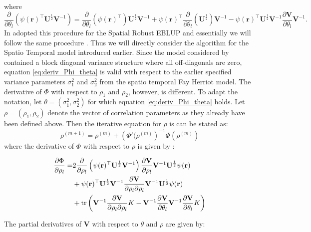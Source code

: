 where \[
\frac{\partial}{\partial\theta_l}\left(\psi(\mathbf{r})^\top\mathbf{U}^{\frac{1}{2}}\mathbf{V}^{-1}\right) = \frac{\partial}{\partial\theta_l}(\psi(\mathbf{r})^\top)\mathbf{U}^\frac{1}{2}\mathbf{V}^{-1} + \psi(\mathbf{r})^\top\frac{\partial}{\partial\theta_l}(\mathbf{U}^\frac{1}{2})\mathbf{V}^{-1} - \psi(\mathbf{r})^\top\mathbf{U}^\frac{1}{2}\mathbf{V}^{-1}\frac{\partial\mathbf{V}}{\partial\theta_l}\mathbf{V}^{-1}.
\] In \textcite{Sch12} adopted this procedure for the Spatial Robust
EBLUP and essentially we will follow the same procedure
\textcite[p.74ff.]{Sch12}. Thus we will directly consider the algorithm
for the Spatio Temporal model introduced earlier. Since the model
considered by \textcite{Sin09} contained a block diagonal variance
structure where all off-diagonals are zero, equation
\ref{eq:deriv_Phi_theta} is valid with respect to the earlier specified
variance parameters $\sigma_1^2$ and $\sigma_2^2$ from the spatio
temporal Fay Herriot model. The derivative of $\Phi$ with respect to
$\rho_1$ and $\rho_2$, however, is different. To adapt the notation, let
$\theta = (\sigma_1^2, \sigma_2^2)$ for which equation
\ref{eq:deriv_Phi_theta} holds. Let $\rho = (\rho_1, \rho_2)$ denote the
vector of correlation parameters as they already have been defined
above. Then the iterative equation for $\rho$ is can be stated as: \[
\rho^{(m+1)} = \rho^{(m)} + \left(\Phi'(\rho^{(m)}\right)^{-1}\Phi(\rho^{(m)})
\] where the derivative of $\Phi$ with respect to $\rho$ is given by
\textcite[p.76]{Sch12}:

\begin{align*}
\frac{\partial\Phi}{\partial\rho_l} =& 2\frac{\partial}{\partial\rho_l}\left(\psi(\mathbf{r})^\top\mathbf{U}^{\frac{1}{2}}\mathbf{V}^{-1}\right)\frac{\partial\mathbf{V}}{\partial\rho_l}\mathbf{V}^{-1}\mathbf{U}^{\frac{1}{2}}\psi(\mathbf{r})\\
&+ \psi(\mathbf{r})^\top\mathbf{U}^{\frac{1}{2}}\mathbf{V}^{-1} \frac{\partial\mathbf{V}}{\partial\rho_l\partial\rho_l} \mathbf{V}^{-1}\mathbf{U}^{\frac{1}{2}}\psi(\mathbf{r}) \\
&+ \operatorname{tr}\left(\mathbf{V}^{-1}\frac{\partial\mathbf{V}}{\partial\rho_l\partial\rho_l} K - \mathbf{V}^{-1}\frac{\partial\mathbf{V}}{\partial\theta_l}\mathbf{V}^{-1}\frac{\partial\mathbf{V}}{\partial\theta_l} K\right)
\end{align*}

The partial derivatives of $\mathbf{V}$ with respect to $\theta$ and
$\rho$ are given by:

